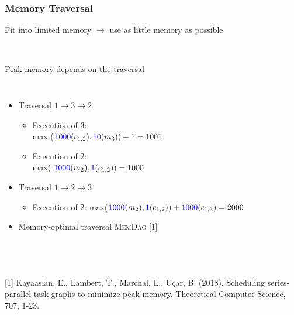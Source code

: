 \documentclass[xcolor=svgnames,titlepage,english,presentation]{beamer}
\begin{document}
\begin{frame}[t]
    \frametitle{Memory Traversal}

    Fit into limited memory $\rightarrow$ use as little memory as possible

    ~~~~~~~~~~~~~~

  Peak memory depends on the traversal 

    
 \begin{columns}
     \begin{itemize}            
               \item Traversal $1 \rightarrow 3 \rightarrow 2$ 
             \begin{itemize}
                \item Execution of 3: \\ max ($\textcolor{blue}{1000} (c_{1,2}), \textcolor{blue}{10} (m_3))  + 1 = 1001$
                \item Execution of 2: \\ max( $\textcolor{blue}{1000} (m_2) , \textcolor{blue}{1} (c_{1,2})) = 1000$
            \end{itemize}
            \item Traversal $1 \rightarrow 2 \rightarrow 3$ 
            \begin{itemize}
                \item Execution of 2: max($\textcolor{blue}{1000} (m_2), \textcolor{blue}{1} (c_{1,2})) + \textcolor{blue}{1000} (c_{1,3}) = 2000$
            \end{itemize}         

            \item Memory-optimal traversal \textsc{MemDag} [1]
                       
        \end{itemize}

    \end{columns}  

~~~~~~~~~~~~~

 \footnotesize {[1] Kayaaslan, E., Lambert, T., Marchal, L., U{\c{c}}ar, B. (2018). Scheduling series-parallel task graphs to minimize peak memory. Theoretical Computer Science, 707, 1-23.}

 ~~~~~~
\end{frame}
\end{document}
